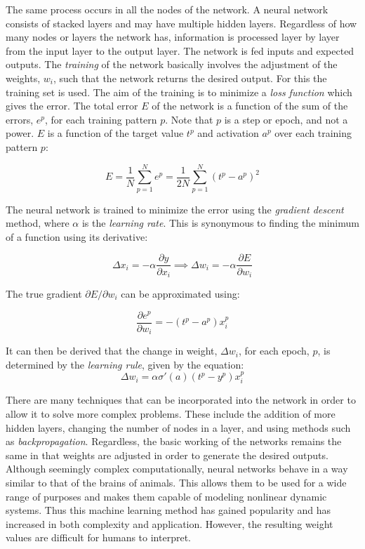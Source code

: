 \documentclass[a4paper, 12pt]{report}
\theoremstyle{definition}
\begin{document}
The same process occurs in all the nodes of the network. A neural network consists of stacked layers and may have multiple hidden layers. Regardless of how many nodes or layers the network has, information is processed layer by layer from the input layer to the output layer. The network is fed inputs and expected outputs. The \textit{training} of the network basically involves the adjustment of the weights, $w_i$, such that the network returns the desired output. For this the training set is used. The aim of the training is to minimize a \textit{loss function} which gives the error. The total error $E$ of the network is a function of the sum of the errors, $e^{p}$, for each training pattern $p$. Note that $p$ is a step or epoch, and not a power. $E$ is a function of the target value $t^{p}$ and activation $a^{p}$ over each training pattern $p$:

\begin{equation}
    E = \frac{1}{N} \sum_{p=1}^N e^{p}= \frac{1}{2N} \sum_{p=1}^N  (t^{p} - a^{p})^2
\end{equation}

The neural network is trained to minimize the error using the \textit{gradient descent} method, where $\alpha$ is the \textit{learning rate}. This is synonymous to finding the minimum of a function using its derivative:

\begin{equation}
    \Delta x_i = - \alpha \frac{\partial y}{\partial x_i} \implies \Delta w_i = - \alpha \frac{\partial E}{\partial w_i}
\end{equation}

The true gradient $\partial E / \partial w_i$ can be approximated using:

\begin{equation}
    \frac{\partial e^p}{\partial w_i} = -(t^p - a^p) x^p_i
\end{equation}

It can then be derived that the change in weight, $\Delta w_i$, for each epoch, $p$, is determined by the \textit{learning rule}, given by the equation:
\begin{equation}
    \Delta w_i = \alpha \sigma '(a) (t^p -y^p) x^p_i
\end{equation}

There are many techniques that can be incorporated into the network in order to allow it to solve more complex problems. These include the addition of more hidden layers, changing the number of nodes in a layer, and using methods such as \textit{backpropagation}. Regardless, the basic working of the networks remains the same in that weights are adjusted in order to generate the desired outputs. Although seemingly complex computationally, neural networks behave in a way similar to that of the brains of animals. This allows them to be used for a wide range of purposes and makes them capable of modeling nonlinear dynamic systems. Thus this machine learning method has gained popularity and has increased in both complexity and application. However, the resulting weight values are difficult for humans to interpret.
\end{document}
